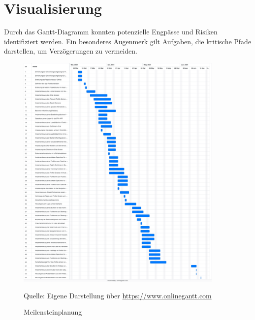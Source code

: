 \section{Visualisierung}
Durch das Gantt-Diagramm konnten potenzielle Engpässe und Risiken identifiziert werden.
Ein besonderes Augenmerk gilt Aufgaben, die kritische Pfade darstellen, um Verzögerungen zu vermeiden.

\begin{figure}[H]
    \setcounter{figure}{3}
    \caption[Meilensteinplanung]{Meilensteinplanung}
	\centering
	\includegraphics[width=0.9\textwidth]{assets/figures/STH GANTT Diagramm.png}
	\begin{flushleft}
		Quelle: Eigene Darstellung über \url{https://www.onlinegantt.com}
	\end{flushleft}
\end{figure}



